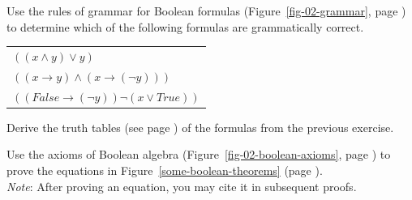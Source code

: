 \begin{ExerciseList}

\Exercise Use the rules of grammar for Boolean formulas (Figure~\ref{fig-02-grammar}, page \pageref{fig-02-grammar})
to determine which of the following formulas are grammatically correct.
\begin{center}
\begin{tabular}{l}
$((x \wedge y) \vee y )$ \\
$((x \rightarrow y) \wedge (x \rightarrow (\neg y)))$ \\
$((False \rightarrow (\neg y)) \neg (x \vee True))$ \\
\end{tabular}
\end{center}


\Exercise Derive the truth tables (see page \pageref{truth-tables})
of the formulas from the previous exercise.

\Exercise Use the axioms of Boolean algebra
(Figure~\ref{fig-02-boolean-axioms}, page \pageref{fig-02-boolean-axioms})
to prove the equations in
Figure~\ref{some-boolean-theorems} (page \pageref{some-boolean-theorems}).\\
\emph{Note}: After proving an equation, you may cite it in subsequent proofs.

\end{ExerciseList}

